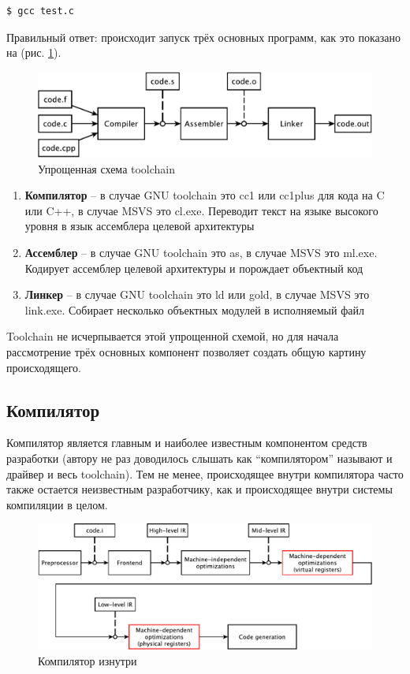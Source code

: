 \documentclass[a4paper,12pt,oneside]{article}
\begin{document}
\begin{verbatim}
$ gcc test.c
\end{verbatim}

Правильный ответ: происходит запуск трёх основных программ, как это показано на (рис. \ref{fig:simplified_scheme}).

\begin{figure}[ht]
\centering
\includegraphics[width=1.0\textwidth]{illustrations/simplified-scheme-crop.pdf}
\caption{Упрощенная схема toolchain}
\label{fig:simplified_scheme}
\end{figure}

\begin{enumerate}
\item \textbf{Компилятор} -- в случае GNU toolchain это cc1 или cc1plus для кода на C или C++, в случае MSVS это cl.exe. Переводит текст на языке высокого уровня в язык ассемблера целевой архитектуры
\item \textbf{Ассемблер} -- в случае GNU toolchain это as, в случае MSVS это ml.exe. Кодирует ассемблер целевой архитектуры и порождает объектный код
\item \textbf{Линкер} -- в случае GNU toolchain это ld или gold, в случае MSVS это link.exe. Собирает несколько объектных модулей в исполняемый файл
\end{enumerate}

Toolchain не исчерпывается этой упрощенной схемой, но для начала рассмотрение трёх основных компонент позволяет создать общую картину происходящего.

\subsection{Компилятор}

Компилятор является главным и наиболее известным компонентом средств разработки (автору не раз доводилось слышать как ``компилятором'' называют и драйвер и весь toolchain). Тем не менее, происходящее внутри компилятора часто также остается неизвестным разработчику, как и происходящее внутри системы компиляции в целом.

\begin{figure}[ht]
\centering
\includegraphics[width=1.0\textwidth]{illustrations/compiler-crop.pdf}
\caption{Компилятор изнутри}
\label{fig:compiler_scheme}
\end{figure}
\end{document}
